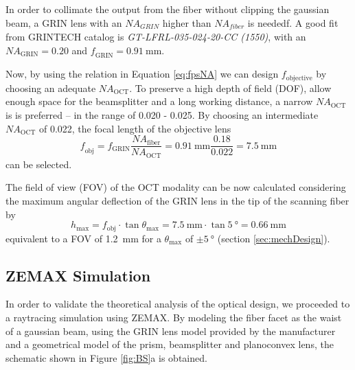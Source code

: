 In order to collimate the output from the fiber without clipping the gaussian beam, a GRIN lens with an $\mathit{NA_{GRIN}}$ higher than $\mathit{NA_{fiber}}$ is neededf. A good fit from GRINTECH catalog is \textit{GT-LFRL-035-024-20-CC (1550)}, with an $\mathit{NA_\mathrm{GRIN}} = 0.20$ and $\mathit{f_\mathrm{GRIN}} = \SI{0.91}{\milli\meter}$. 

Now, by using the relation in Equation \ref{eq:fpsNA} we can design $f_\mathrm{objective}$ by choosing an adequate $\mathit{NA_\mathrm{OCT}}$. To preserve a high depth of field (DOF), allow enough space for the beamsplitter and a long working distance, a narrow $\mathit{NA_\mathrm{OCT}}$ is is preferred -- in the range of 0.020 - 0.025. By choosing an intermediate $\mathit{NA_\mathrm{OCT}}$ of 0.022, the focal length of the objective lens 
\begin{equation}
\mathit{f_\mathrm{obj}} = f_\mathrm{GRIN} \frac{\mathit{NA_\mathrm{fiber}}}{\mathit{NA_\mathrm{OCT}}}  = \SI{0.91}{\milli\meter} \frac{0.18}{0.022} = \SI{7.5}{\milli\meter}
\end{equation}
can be selected.

The field of view (FOV) of the OCT modality can be now calculated considering the maximum angular deflection of the GRIN lens in the tip of the scanning fiber by 
\begin{equation}
h_\mathrm{max} = f_\mathrm{obj}\cdot \tan  \theta_\mathrm{max} = \SI{7.5}{\milli\meter} \cdot \tan \SI{5}{\degree} = \SI{0.66}{\milli\meter} 
\end{equation}
equivalent to a FOV of \SI{1.2}{\milli\meter} for a $\theta_\mathrm{max} $ of $ \pm \SI{5}{\degree}$ (section \ref{sec:mechDesign}).


\subsection*{ZEMAX Simulation}

In order to validate the theoretical analysis of the optical design, we proceeded to a raytracing simulation using ZEMAX. By modeling the fiber facet as the waist of a gaussian beam, using the GRIN lens model provided by the manufacturer and a geometrical model of the prism, beamsplitter and planoconvex lens, the schematic shown in Figure \autoref{fig:BS}a is obtained. 

